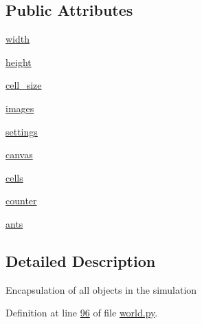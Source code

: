 \subsection*{Public Attributes}
\begin{DoxyCompactItemize}
\item 
\hyperlink{classworld_1_1World_a5ace9de2d4cd40bbb013db9712f4ef34}{width}
\item 
\hyperlink{classworld_1_1World_acfdba03fac144372fcc56922a1a339a2}{height}
\item 
\hyperlink{classworld_1_1World_ae1d7a76e88da46ba689ac807d6a9a961}{cell\+\_\+size}
\item 
\hyperlink{classworld_1_1World_a9388f4c8146cbf9983f4a42c3015b61a}{images}
\item 
\hyperlink{classworld_1_1World_a41e0f9d00bb365408abee5a084bdce24}{settings}
\item 
\hyperlink{classworld_1_1World_a6b3bb67973002c5018e11031462c31eb}{canvas}
\item 
\hyperlink{classworld_1_1World_a2314ff704272429f24c5d1f731ce7e8d}{cells}
\item 
\hyperlink{classworld_1_1World_a93d8708ed00be71dfd78cb42767529ce}{counter}
\item 
\hyperlink{classworld_1_1World_aff3d808329d4220a8bd5e917c151c14a}{ants}
\end{DoxyCompactItemize}


\subsection{Detailed Description}
\begin{DoxyVerb}Encapsulation of all objects in the simulation\end{DoxyVerb}
 

Definition at line \hyperlink{world_8py_source_l00096}{96} of file \hyperlink{world_8py_source}{world.\+py}.



